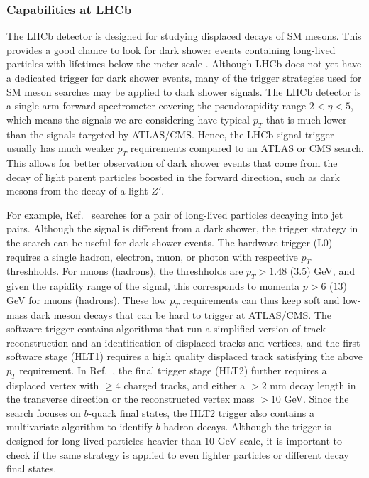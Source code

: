 \subsubsection{Capabilities at LHCb}

The LHCb detector is designed for studying displaced decays of SM mesons. This provides a good chance to look for dark shower events containing long-lived particles with lifetimes below the meter scale \cite{Strassler:2006qa}. Although LHCb does not yet have a dedicated trigger for dark shower events, many of the trigger strategies used for SM meson searches may be applied to dark shower signals. The LHCb detector is a single-arm forward spectrometer covering the pseudorapidity range $2<\eta<5$, which means the signals we are considering have typical $p_T$ that is much lower than the signals targeted by ATLAS/CMS. Hence, the LHCb signal trigger usually has much weaker $p_T$ requirements compared to an ATLAS or CMS search. This allows for better observation of dark shower events that come from the decay of light parent particles boosted in the forward direction, such as dark mesons from the decay of a light $Z'$.

For example, Ref.~\cite{Aaij:2014nma} searches for a pair of long-lived particles decaying into jet pairs. Although the signal is different from a dark shower, the trigger strategy in the search can be useful for dark shower events. The hardware trigger (L0) requires a single hadron, electron, muon, or photon with respective $p_T$ threshholds. For muons (hadrons), the threshholds are $p_T>1.48$ ($3.5$) GeV, and given the rapidity range of the signal, this corresponds to momenta $p> 6$ ($13$) GeV for muons (hadrons). These low $p_T$ requirements can thus keep soft and low-mass dark meson decays that can be hard to trigger at ATLAS/CMS. The software trigger contains algorithms that run a simplified version of track reconstruction and an identification of displaced tracks and vertices, and the first software stage (HLT1) requires a high quality displaced track satisfying the above $p_T$ requirement. In Ref.~\cite{Aaij:2014nma}, the final trigger stage (HLT2) further requires a displaced vertex with $\geq 4$ charged tracks, and either a $>2$ mm decay length in the transverse direction or the reconstructed vertex mass $>10$ GeV. Since the search focuses on $b$-quark final states, the HLT2 trigger also contains a multivariate algorithm to identify $b$-hadron decays. Although the trigger is designed for long-lived particles heavier than $10$ GeV scale, it is important to check if the same strategy is applied to even lighter particles or different decay final states.

